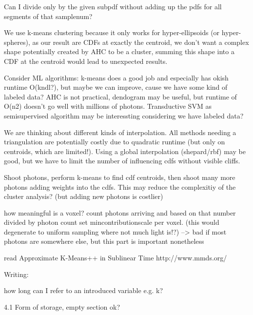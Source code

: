 Can I divide only by the given subpdf without adding up the pdfs for all segments of that samplenum?

We use k-means clustering because it only works for hyper-ellipsoids (or hyper-spheres), as our result are CDFs at exactly the centroid, we don't want a complex shape potentially created by AHC to be a cluster, summing this shape into a CDF at the centroid would lead to unexpected results.

Consider ML algorithms: k-means does a good job and especially has okish runtime O(kndl?), but maybe we can improve, cause we have some kind of labeled data? AHC is not practical, dendogram may be useful, but runtime of O(n2) doesn't go well with millions of photons. Transductive SVM as semisupervised algorithm may be interessting considering we have labeled data? 

We are thinking about different kinds of interpolation. All methods needing a triangulation are potentially costly due to quadratic runtime (but only on centroids, which are limited!). Using a global interpolation (shepard/rbf) may be good, but we have to limit the number of influencing cdfs without visible cliffs.

Shoot photons, perform k-means to find cdf centroids, then shoot many more photons adding weights into the cdfs. This may reduce the complexitiy of the cluster analysis? (but adding new photons is costlier)

how meaningful is a voxel? count photons arriving and based on that number divided by photon count set mincontributionscale per voxel. (this would degenerate to uniform sampling where not much light is!?) --> bad if most photons are somewhere else, but this part is important nonetheless

read
Approximate K-Means++ in Sublinear Time
http://www.mmds.org/



Writing:

how long can I refer to an introduced variable e.g. k?

4.1 Form of storage, empty section ok?